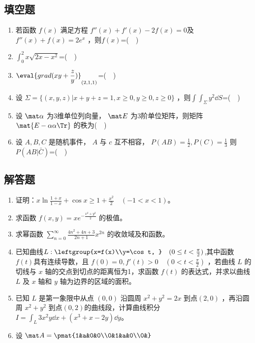 \subsection{填空题}
\begin{enumerate}
\item 若函数 $f(x)$  满足方程 $f''(x)+f'(x)-2f(x)=0$及$f''(x)+f(x)=2e^x$ ，则$f(x)$=($\quad$)
\item $\displaystyle \int_{0}^{2} x\sqrt{2x-x^2}$=($\quad$)
\item $\displaystyle \eval{ grad(xy+\frac{z}{y})}_{(2,1,1)}$=($\quad$)
\item  设 $\Sigma=\{(x,y,z)|x+y+z=1,x\ge 0,y \ge 0,z \ge 0\}$  ，则$\displaystyle \int \int_\Sigma y^2\dd{S}$=($\quad$)
\item 设 $\mat \alpha$ 为3维单位列向量， $\mat E$ 为3阶单位矩阵，则矩阵 $\mat {E-\alpha\alpha \Tr}$ 的秩为($\quad$)
\item 设 $A,B,C$ 是随机事件， $A$ 与 $c$ 互不相容， $P(AB)=\frac{1}{2},P(C)=\frac{1}{3}$  则 $P(AB|\bar C)$=($\quad$)
\end{enumerate}
\subsection{解答题}
\begin{enumerate}
\item 证明：$\displaystyle x\ln \frac{1+x}{1-x}+\cos x\ge 1+\frac{x^2}{2} \quad (-1<x<1)$。
\item  求函数 $\displaystyle f(x,y)=xe^{-\frac{x^2+y^2}{2}}$  的极值。
\item  求幂函数 $\displaystyle \sum_{n=0}^\infty \frac{4n^2+4n+3}{2n+1}x^{2n}$ 的收敛域及和函数。
\item 已知曲线$L:\leftgroup{x=f(x)\\y=\cos t, }\quad (0 \le t<\frac{\pi}{2} )$,其中函数 $f(t)$具有连续导数，且 $f(0)=0,f'(t)>0 \quad (0<t<\frac{\pi}{2})$  ，若曲线 $L$ 的切线与 $x$ 轴的交点到切点的距离恒为1，求函数 $f(t)$ 的表达式，并求以曲线 $L$  及 $x$ 轴和 $y$ 轴为边界的区域的面积。
\item  已知 $L$ 是第一象限中从点 $(0,0)$ 沿圆周 $x^2+y^2=2x$ 到点$ (2,0)$ ，再沿圆周 $x^2+y^2$ 到点$ (0,2)$的曲线段，计算曲线积分  $\displaystyle I=\int_L 3x^2y\dd{x+(x^3+x-2y)}\dd{y}$。
\item 设 $\mat A=\pmat{1&a&0&0\\0&1&a&0\\0&}$
\end{enumerate}
